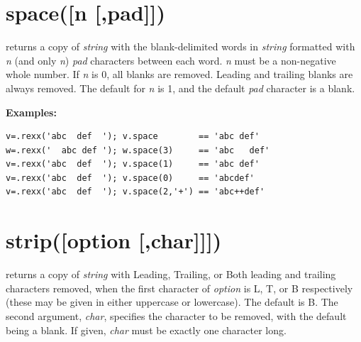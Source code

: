 
\section{space([n [,pad{]]})}\label{refspace}
returns a copy of \emph{string} with the blank-delimited words in
\emph{string} formatted with \emph{n} (and only \emph{n})
\emph{pad} characters between each word.
\emph{n} must be a non-negative whole number.
If \emph{n} is 0, all blanks are removed.
Leading and trailing blanks are always removed.
The default for \emph{n} is 1, and the default \emph{pad}
character is a blank.
 
\textbf{Examples:}
\begin{lstlisting}
v=.rexx('abc  def  '); v.space        == 'abc def'
w=.rexx('  abc def '); w.space(3)     == 'abc   def'
v=.rexx('abc  def  '); v.space(1)     == 'abc def'
v=.rexx('abc  def  '); v.space(0)     == 'abcdef'
v=.rexx('abc  def  '); v.space(2,'+') == 'abc++def'
\end{lstlisting}

  
\section{strip([option [,char{]]}])}\label{refstrip}
returns a copy of \emph{string} with Leading, Trailing, or Both
leading and trailing characters removed, when the first character of
\emph{option} is L, T, or B respectively (these may be given in
either uppercase or lowercase).  The default is B.
The second argument, \emph{char}, specifies the character to be
removed, with the default being a blank.
If given, \emph{char} must be exactly one character long.
 
